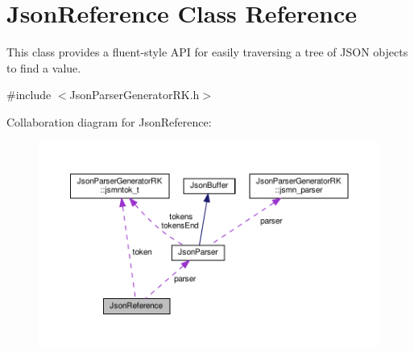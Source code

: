 \hypertarget{class_json_reference}{}\section{Json\+Reference Class Reference}
\label{class_json_reference}


This class provides a fluent-\/style A\+PI for easily traversing a tree of J\+S\+ON objects to find a value.  




{\ttfamily \#include $<$Json\+Parser\+Generator\+R\+K.\+h$>$}



Collaboration diagram for Json\+Reference\+:\nopagebreak
\begin{figure}[H]
\begin{center}
\leavevmode
\includegraphics[width=350pt]{class_json_reference__coll__graph}
\end{center}
\end{figure}

